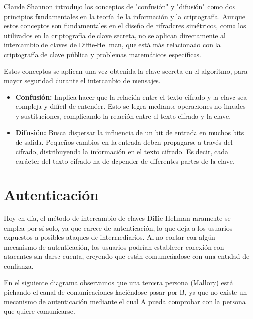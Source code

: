 \documentclass[11pt]{article}
\begin{document}
Claude Shannon introdujo los conceptos de "confusión" y "difusión" como dos principios fundamentales en la teoría de la información y la criptografía. Aunque estos conceptos son fundamentales en el diseño de cifradores simétricos, como los utilizados en la criptografía de clave secreta, no se aplican directamente al intercambio de claves de Diffie-Hellman, que está más relacionado con la criptografía de clave pública y problemas matemáticos específicos.

Estos conceptos se aplican una vez obtenida la clave secreta en el algoritmo, para mayor seguridad durante el intercanbio de mensajes.

\begin{itemize}
	\item \textbf{Confusión:} Implica hacer que la relación entre el texto cifrado y la clave sea compleja y difícil de entender. Esto se logra mediante operaciones no lineales y sustituciones, complicando la relación entre el texto cifrado y la clave.

	\item \textbf{Difusión:} Busca dispersar la influencia de un bit de entrada en muchos bits de salida. Pequeños cambios en la entrada deben propagarse a través del cifrado, distribuyendo la información en el texto cifrado. Es decir, cada carácter del texto cifrado ha de depender de diferentes partes de la clave.
\end{itemize}


\section{Autenticación}

Hoy en día, el método de intercambio de claves Diffie-Hellman raramente se emplea por sí solo, ya que carece de autenticación, lo que deja a los usuarios expuestos a posibles ataques de intermediarios. Al no contar con algún mecanismo de autenticación, los usuarios podrían establecer conexión con atacantes sin darse cuenta, creyendo que están comunicándose con una entidad de confianza.

\newpage

En el siguiente diagrama observamos que una tercera persona (Mallory) está pichando el canal de comunicaciones haciéndose pasar por B, ya que no existe un mecanismo de autenticación mediante el cual A pueda comprobar con la persona que quiere comunicarse.
\begin{center}\end{center}
\end{document}
